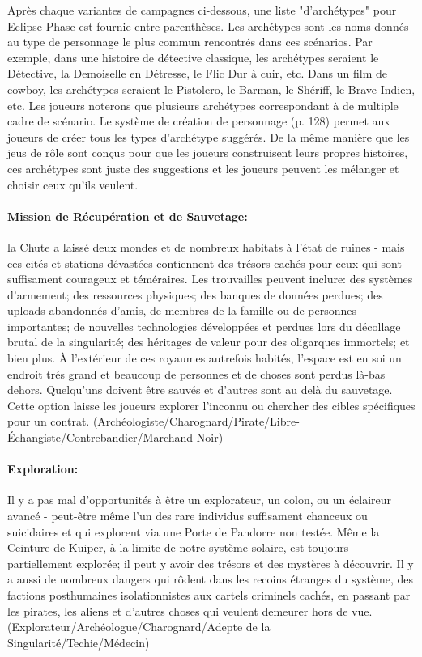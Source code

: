 Après chaque variantes de campagnes ci-dessous, une liste "d'archétypes" pour Eclipse Phase est fournie entre parenthèses. Les archétypes sont les noms donnés au type de personnage le plus commun rencontrés dans ces scénarios. Par exemple, dans une histoire de détective classique, les archétypes seraient le Détective, la Demoiselle en Détresse, le Flic Dur à cuir, etc. Dans un film de cowboy, les archétypes seraient le Pistolero, le Barman, le Shériff, le Brave Indien, etc. Les joueurs noterons que plusieurs archétypes correspondant à de multiple cadre de scénario. Le système de création de personnage (p. 128) permet aux joueurs de créer tous les types d'archétype suggérés. De la même manière que les jeus de rôle sont conçus pour que les joueurs construisent leurs propres histoires, ces archétypes sont juste des suggestions et les joueurs peuvent les mélanger et choisir ceux qu'ils veulent. 

\paragraph{Mission de Récupération et de Sauvetage:} la Chute a laissé deux mondes et de nombreux habitats à l'état de ruines - mais ces cités et stations dévastées contiennent des trésors cachés pour ceux qui sont suffisament courageux et téméraires. Les trouvailles peuvent inclure: des systèmes d'armement; des ressources physiques; des banques de données perdues; des uploads abandonnés d'amis, de membres de la famille ou de personnes importantes; de nouvelles technologies développées et perdues lors du décollage brutal de la singularité; des héritages de valeur pour des oligarques immortels; et bien plus. À l'extérieur de ces royaumes autrefois habités, l'espace est en soi un endroit trés grand et beaucoup de personnes et de choses sont perdus là-bas dehors. Quelqu'uns doivent être sauvés et d'autres sont au delà du sauvetage. Cette option laisse les joueurs explorer l'inconnu ou chercher des cibles spécifiques pour un contrat. (Archéologiste/Charognard/Pirate/Libre-Échangiste/Contrebandier/Marchand Noir) 

\paragraph{Exploration:} Il y a pas mal d'opportunités à être un explorateur, un colon, ou un éclaireur avancé - peut-être même l'un des rare individus suffisament chanceux ou suicidaires et qui explorent via une Porte de Pandorre non testée. Même la Ceinture de Kuiper, à la limite de notre système solaire, est toujours partiellement explorée; il peut y avoir des trésors et des mystères à découvrir. Il y a aussi de nombreux dangers qui rôdent dans les recoins étranges du système, des factions posthumaines isolationnistes aux cartels criminels cachés, en passant par les pirates, les aliens et d'autres choses qui veulent demeurer hors de vue. (Explorateur/Archéologue/Charognard/Adepte de la Singularité/Techie/Médecin) 

